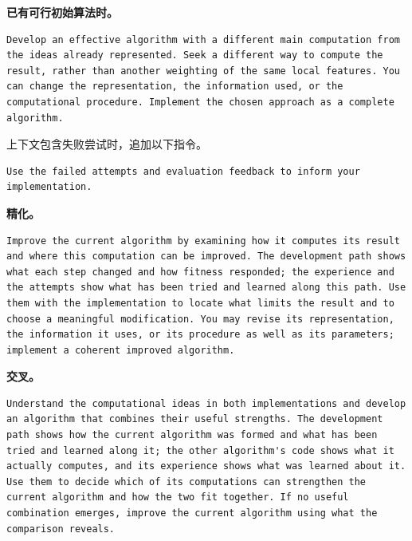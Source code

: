 \documentclass{article}
\begin{document}
\noindent\begin{minipage}{\linewidth}
\textbf{已有可行初始算法时。}

\begin{verbatim}
Develop an effective algorithm with a different main computation from the ideas already represented. Seek a different way to compute the result, rather than another weighting of the same local features. You can change the representation, the information used, or the computational procedure. Implement the chosen approach as a complete algorithm.
\end{verbatim}
\end{minipage}\par

上下文包含失败尝试时，追加以下指令。

\noindent\begin{minipage}{\linewidth}
\begin{verbatim}
Use the failed attempts and evaluation feedback to inform your implementation.
\end{verbatim}
\end{minipage}\par

\noindent\begin{minipage}{\linewidth}
\textbf{精化。}

\begin{verbatim}
Improve the current algorithm by examining how it computes its result and where this computation can be improved. The development path shows what each step changed and how fitness responded; the experience and the attempts show what has been tried and learned along this path. Use them with the implementation to locate what limits the result and to choose a meaningful modification. You may revise its representation, the information it uses, or its procedure as well as its parameters; implement a coherent improved algorithm.
\end{verbatim}
\end{minipage}\par

\noindent\begin{minipage}{\linewidth}
\textbf{交叉。}

\begin{verbatim}
Understand the computational ideas in both implementations and develop an algorithm that combines their useful strengths. The development path shows how the current algorithm was formed and what has been tried and learned along it; the other algorithm's code shows what it actually computes, and its experience shows what was learned about it. Use them to decide which of its computations can strengthen the current algorithm and how the two fit together. If no useful combination emerges, improve the current algorithm using what the comparison reveals.
\end{verbatim}
\end{minipage}\par
\end{document}

